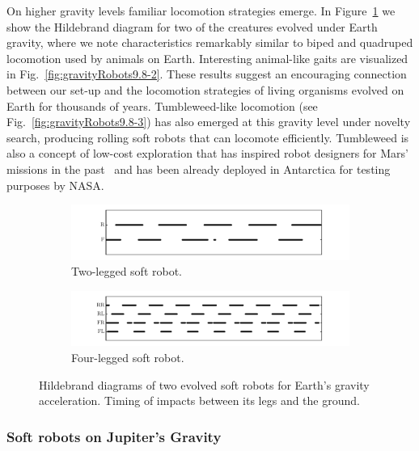 \documentclass{sig-alternate}
\begin{document}
On higher gravity levels familiar locomotion strategies emerge. In Figure~\ref{fig:hildebrand} we show the Hildebrand diagram for two of the creatures evolved under Earth gravity, where we note characteristics remarkably similar to biped and quadruped locomotion used by animals on Earth. Interesting animal-like gaits are visualized in Fig.~\ref{fig:gravityRobots9.8-2}. These results suggest an encouraging connection between our set-up and the locomotion strategies of living organisms evolved on Earth for thousands of years. Tumbleweed-like locomotion (see Fig.~\ref{fig:gravityRobots9.8-3}) has also emerged at this gravity level under novelty search, producing rolling soft robots that can locomote efficiently. 
Tumbleweed is also a concept of low-cost exploration that has inspired robot designers for Mars' missions in the past~\cite{antol2003low} and has been already deployed in Antarctica for testing purposes by NASA.

\begin{figure}[t!]
\centering
\begin{subfigure}[b]{0.5\textwidth}
\centering
\includegraphics[width=1.0\textwidth]{../Figures/Results/hildebrand1.pdf}
\caption{Two-legged soft robot.}
\end{subfigure}
\begin{subfigure}[b]{0.5\textwidth}
\centering
\includegraphics[width=1.0\textwidth]{../Figures/Results/hildebrand2.pdf}
\caption{Four-legged soft robot.}
\end{subfigure}
\caption{Hildebrand diagrams of two evolved soft robots for Earth's gravity acceleration. Timing of impacts between its legs and the ground.}
\label{fig:hildebrand}
\end{figure}


\subsubsection*{Soft robots on Jupiter's Gravity}
\end{document}
